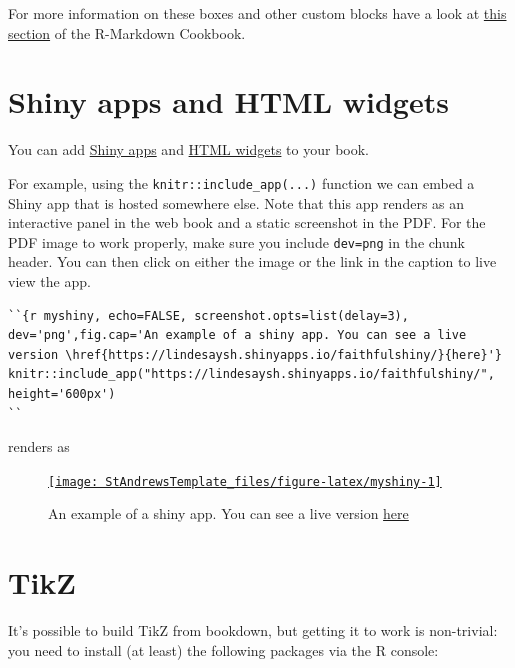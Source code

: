 \documentclass[
  british,
  oneside]{krantz}
\theoremstyle{definition}
\theoremstyle{definition}
\theoremstyle{definition}
\theoremstyle{definition}
\theoremstyle{remark}
\begin{document}
For more information on these boxes and other custom blocks have a look at \href{https://bookdown.org/yihui/rmarkdown-cookbook/custom-blocks.html}{this section} of the R-Markdown Cookbook.

\hypertarget{shiny-apps-and-html-widgets}{%
\section{Shiny apps and HTML widgets}\label{shiny-apps-and-html-widgets}}

You can add \href{https://bookdown.org/yihui/bookdown/web-pages-and-shiny-apps.html}{Shiny apps} and \href{https://bookdown.org/yihui/bookdown/html-widgets.html}{HTML widgets} to your book.

For example, using the \texttt{knitr::include\_app(...)} function we can embed a Shiny app that is hosted somewhere else.
Note that this app renders as an interactive panel in the web book and a static screenshot in the PDF. For the PDF image to work properly, make sure you include \texttt{dev=\textquotesingle{}png\textquotesingle{}} in the chunk header. You can then click on either the image or the link in the caption to live view the app.

\begin{verbatim}
``{r myshiny, echo=FALSE, screenshot.opts=list(delay=3), dev='png',fig.cap='An example of a shiny app. You can see a live version \href{https://lindesaysh.shinyapps.io/faithfulshiny/}{here}'}
knitr::include_app("https://lindesaysh.shinyapps.io/faithfulshiny/", height='600px')
``
\end{verbatim}

renders as



\begin{figure}

{\centering \href{https://lindesaysh.shinyapps.io/faithfulshiny/}{\texttt{[image: StAndrewsTemplate\_files/figure-latex/myshiny-1]} }

}

\caption{An example of a shiny app. You can see a live version \href{https://lindesaysh.shinyapps.io/faithfulshiny/}{here}}\label{fig:myshiny}
\end{figure}

\hypertarget{tikz}{%
\section{TikZ}\label{tikz}}

It's possible to build TikZ from bookdown, but getting it to work is non-trivial: you need to install (at least) the following packages via the R console:
\end{document}
